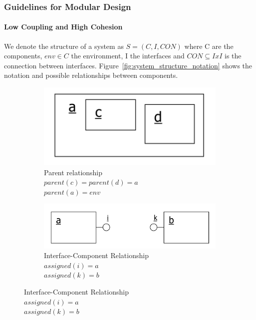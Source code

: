 \subsubsection{Guidelines for Modular Design}
\paragraph{Low Coupling and High Cohesion}
We denote the structure of a system as $S = (C,I,CON)$ where C are the components, $env \in C$ the environment, I the interfaces and $CON \subseteq I x I$ is the connection between interfaces.
Figure~\ref{fig:system_structure_notation} shows the notation and possible relationships between components.
\begin{figure}[h]
  \centering
  \begin{subfigure}{.3\textwidth}
    \centering
    \includegraphics[width=\textwidth]{images/component_parent_relationship.png}
    \caption{Parent relationship\\ $parent(c) = parent(d) = a$\\ $parent(a) = env$}
  \end{subfigure}
  \hspace{.03\textwidth}
  \begin{subfigure}{.3\textwidth}
    \centering
    \includegraphics[width=\textwidth]{images/component_interface_relationship.png}
    \caption{Interface-Component Relationship\\ $assigned(i) = a$\\ $assigned(k) = b$}
  \end{subfigure}

\end{figure}
